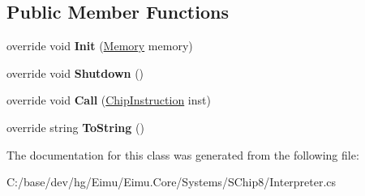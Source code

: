 \subsection*{Public Member Functions}
\begin{DoxyCompactItemize}
\item 
\hypertarget{class_eimu_1_1_core_1_1_systems_1_1_s_chip8_1_1_engines_1_1_interpreter_a6042dea31534cde46ff588153fd8204f}{
override void {\bfseries Init} (\hyperlink{class_eimu_1_1_core_1_1_memory}{Memory} memory)}
\label{class_eimu_1_1_core_1_1_systems_1_1_s_chip8_1_1_engines_1_1_interpreter_a6042dea31534cde46ff588153fd8204f}

\item 
\hypertarget{class_eimu_1_1_core_1_1_systems_1_1_s_chip8_1_1_engines_1_1_interpreter_a60a976f2a4cef24466a54201c2f48b3b}{
override void {\bfseries Shutdown} ()}
\label{class_eimu_1_1_core_1_1_systems_1_1_s_chip8_1_1_engines_1_1_interpreter_a60a976f2a4cef24466a54201c2f48b3b}

\item 
\hypertarget{class_eimu_1_1_core_1_1_systems_1_1_s_chip8_1_1_engines_1_1_interpreter_a13fb1592c190650cf590f81bfcd42091}{
override void {\bfseries Call} (\hyperlink{class_eimu_1_1_core_1_1_systems_1_1_s_chip8_1_1_chip_instruction}{ChipInstruction} inst)}
\label{class_eimu_1_1_core_1_1_systems_1_1_s_chip8_1_1_engines_1_1_interpreter_a13fb1592c190650cf590f81bfcd42091}

\item 
\hypertarget{class_eimu_1_1_core_1_1_systems_1_1_s_chip8_1_1_engines_1_1_interpreter_a431863c5fb5f405f3e2cffa080af5af6}{
override string {\bfseries ToString} ()}
\label{class_eimu_1_1_core_1_1_systems_1_1_s_chip8_1_1_engines_1_1_interpreter_a431863c5fb5f405f3e2cffa080af5af6}

\end{DoxyCompactItemize}


The documentation for this class was generated from the following file:\begin{DoxyCompactItemize}
\item 
C:/base/dev/hg/Eimu/Eimu.Core/Systems/SChip8/Interpreter.cs\end{DoxyCompactItemize}
